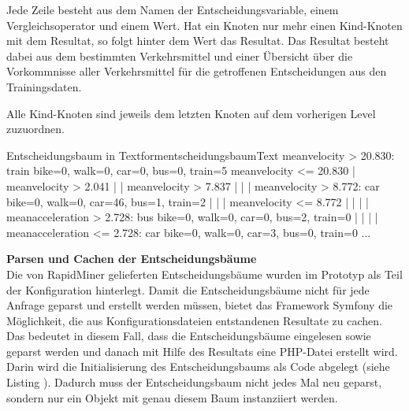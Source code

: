 Jede Zeile besteht aus dem Namen der Entscheidungsvariable, einem Vergleichsoperator und einem Wert. Hat ein Knoten nur mehr einen Kind-Knoten mit dem Resultat, so folgt hinter dem Wert das Resultat. Das Resultat besteht dabei aus dem bestimmten Verkehrsmittel und einer Übersicht über die Vorkommnisse aller Verkehrsmittel für die getroffenen Entscheidungen aus den Trainingsdaten.

Alle Kind-Knoten sind jeweils dem letzten Knoten auf dem vorherigen Level zuzuordnen.

\begin{code}[]{Entscheidungsbaum in Textform}{entscheidungsbaumText}
meanvelocity > 20.830: train {bike=0, walk=0, car=0, bus=0, train=5}
meanvelocity <= 20.830
|   meanvelocity > 2.041
|   |   meanvelocity > 7.837
|   |   |   meanvelocity > 8.772: car {bike=0, walk=0, car=46, bus=1, train=2}
|   |   |   meanvelocity <= 8.772
|   |   |   |   meanacceleration > 2.728: bus {bike=0, walk=0, car=0, bus=2, train=0}
|   |   |   |   meanacceleration <= 2.728: car {bike=0, walk=0, car=3, bus=0, train=0}
...
\end{code}

\textbf{Parsen und Cachen der Entscheidungsbäume} \\
\label{parsenCachenEntscheidungsbaum}
Die von RapidMiner gelieferten Entscheidungsbäume wurden im Prototyp als Teil der Konfiguration hinterlegt. Damit die Entscheidungsbäume nicht für jede Anfrage geparst und erstellt werden müssen, bietet das Framework Symfony die Möglichkeit, die aus Konfigurationsdateien entstandenen Resultate zu cachen. Das bedeutet in diesem Fall, dass die Entscheidungsbäume eingelesen sowie geparst werden und danach mit Hilfe des Resultats eine PHP-Datei erstellt wird. Darin wird die Initialisierung des Entscheidungsbaums als Code abgelegt (siehe Listing ). Dadurch muss der Entscheidungsbaum nicht jedes Mal neu geparst, sondern nur ein Objekt mit genau diesem Baum instanziiert werden. 

\begin{code}[PHP]{Ausschnitt des generierten Entscheidungsbaums als PHP-Klasse}{entscheidungsbaumPHP}
...
class BasicDecisionTree implements DecisionTreeInterface
{
    protected $tree;

    function __construct()
    {
        $node0 = new Node();
        $node0->setDecision(new Decision('meanvelocity', '>', 20.83));
        $node1 = new Node();
        $node1->setResult(new Result(0,0,0,0,5));
        ...
        $node0->setRight($node2);
        $node1->setParent($node1);
        $node2->setParent($node0);
        $node2->setLeft($node3);
        ...
\end{code}

